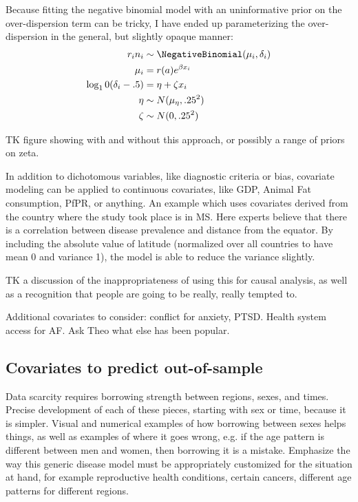 Because fitting the negative binomial model with an uninformative
prior on the over-dispersion term can be tricky, I have ended up
parameterizing the over-dispersion in the general, but slightly opaque manner:
\begin{align*}
r_i n_i &\sim \NegativeBinomial(\mu_i, \delta_i)\\
\mu_i &= r(a)e^{\beta x_i}\\
\log_10(\delta_i-.5) &= \eta + \zeta x_i\\
\eta &\sim N(\mu_\eta, .25^2)\\
\zeta &\sim N(0, .25^2)
\end{align*}

TK figure showing with and without this approach, or possibly a range
of priors on zeta.

In addition to dichotomous variables, like diagnostic criteria or
bias, covariate modeling can be applied to continuous covariates, like
GDP, Animal Fat consumption, PfPR, or anything.  An example which uses
covariates derived from the country where the study took place is in
MS.  Here experts believe that there is a correlation between disease
prevalence and distance from the equator.  By including the absolute
value of latitude (normalized over all countries to have mean 0 and
variance 1), the model is able to reduce the variance slightly.

TK a discussion of the inappropriateness of using this for causal
analysis, as well as a recognition that people are going to be really,
really tempted to.

Additional covariates to consider: conflict for anxiety, PTSD. Health
system access for AF.  Ask Theo what else has been popular.

\subsection{Covariates to predict out-of-sample}

Data scarcity requires borrowing strength between regions, sexes, and
times. Precise development of each of these pieces, starting with sex
or time, because it is simpler. Visual and numerical examples of how
borrowing between sexes helps things, as well as examples of where it
goes wrong, e.g. if the age pattern is different between men and
women, then borrowing it is a mistake. Emphasize the way this generic
disease model must be appropriately customized for the situation at
hand, for example reproductive health conditions, certain cancers,
different age patterns for different regions.

